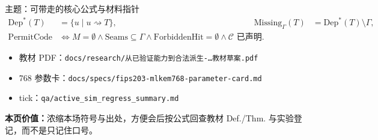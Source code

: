 \documentclass[UTF8,aspectratio=169,11pt]{ctexbeamer}
\newcommand{\pagesummary}[1]{%
  \vfill
  {\footnotesize\noindent\textbf{本页价值：}#1\par}%
}
\begin{document}
\begin{frame}{主题：可带走的核心公式与材料指针}
\begin{align*}
\mathrm{Dep}^*(T)&=\{u\mid u\rightsquigarrow T\},&
\mathrm{Missing}_\Gamma(T)&=\mathrm{Dep}^*(T)\setminus\Gamma,\\
\mathrm{PermitCode}&\iff
M=\emptyset\land\mathrm{Seams}\subseteq\Gamma\land\mathrm{ForbiddenHit}=\emptyset\land\mathcal{C}\text{ 已声明}.
\end{align*}
{\footnotesize
\begin{itemize}
  \item 教材 PDF：\texttt{docs/research/从已验证能力到合法派生-…教材草案.pdf}
  \item 768 参数卡：\texttt{docs/specs/fips203-mlkem768-parameter-card.md}
  \item tick：\texttt{qa/active\_sim\_regress\_summary.md}
\end{itemize}
}
\pagesummary{浓缩本场符号与出处，方便会后按公式回查教材 Def./Thm. 与实验登记，而不是只记住口号。}
\end{frame}
\end{document}
